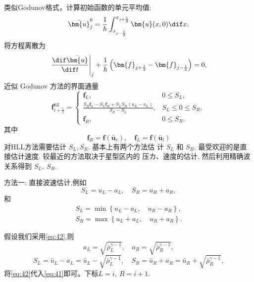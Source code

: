 \documentclass[12pt]{article}
\begin{document}
类似Godunov格式，计算初始函数的单元平均值:
\begin{equation}
	\bar{\bm{u}}_{j}^{0}=\frac{1}{h} \int_{x_{j-\frac{1}{2}}}^{x_{j+\frac{1}{2}}} \bm{u}(x, 0) \dif x.
\end{equation}
将方程离散为
\begin{equation}
	\left.\frac{\dif \bar{\bm{u}}}{\dif t}\right|_{j}+\frac{1}{h}\left(\bm{f}_{j+\frac{1}{2}}-\bm{f}_{j-\frac{1}{2}}\right)=0,
\end{equation}
近似 Godunov 方法的界面通量
\begin{equation}
	\bm{f}_{i+\frac{1}{2}}^{\text{hll}}=\left\{\begin{array}{ll}
		\bm{f}_{L},                                                                                & 0 \leq S_{L},            \\
		\frac{S_{R} \bm{f}_{L}-S_{L} \bm{f}_{R}+S_{L} S_{R}\left(u_{R}-u_{L}\right)}{S_{R}-S_{L}}, & S_{L} \leq 0 \leq S_{R}, \\
		\bm{f}_{R},                                                                                & 0 \leq S_{R}.
	\end{array}\right.
	\label{eq:41}
\end{equation}
其中
\begin{equation}
	\bm{f}_R = \bm{f}(\bar{\bm{u}}_r),\quad \bm{f}_L = \bm{f}(\bar{\bm{u}}_l)
\end{equation}
对HLL方法需要估计 $S_{L}, S_{R} .$ 基本上有两个方法估 计 $S_{L}$ 和 $S_{R} .$ 最受欢迎的是直接估计速度. 较最近的方法取决于星型区内的 压カ、速度的估计, 然后利用精确波关系得到 $S_{L},\ S_{R} .$

方法一: 直接波速估计,例如
\begin{equation}
	S_{L}=u_{L}-a_{L}, \quad S_{R}=u_{R}+a_{R},
	\label{eq:42}
\end{equation}
和
\begin{equation}
	\begin{array}{l}
		S_{L}=\min \left\{u_{L}-a_{L}, \quad u_{R}-a_{R}\right\}, \\
		S_{R}=\max \left\{u_{L}+a_{L}, \quad u_{R}+a_{R}\right\}.
	\end{array}
\end{equation}

假设我们采用\cref{eq:42},则
\begin{equation}
	a_L = \sqrt{\bar{\rho}_L^{\gamma-1}},\quad a_R = \sqrt{\bar{\rho}_R^{\gamma-1}},
\end{equation}
\begin{equation}
	S_{L} = \bar{u}_L - a_L = \bar{u}_L - \sqrt{\bar{\rho}_L^{\gamma-1}},\quad S_{R} = \bar{u}_R + a_R = \bar{u}_R + \sqrt{\bar{\rho}_R^{\gamma-1}},
\end{equation}
将\cref{eq:42}代入\cref{eq:41}即可。下标$L = i,\ R = i+1$.





% 
\end{document}
